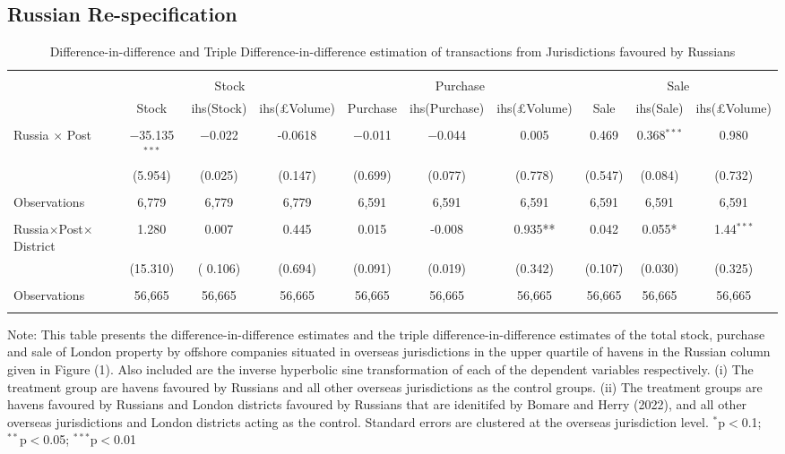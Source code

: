 \documentclass{article}
\begin{document}
\subsection{Russian Re-specification}
\begin{table}[H]
\caption{Difference-in-difference and Triple Difference-in-difference estimation of transactions from Jurisdictions favoured by Russians}
\label{yourLabelHere}
\centering
\large 
\begin{adjustbox}{width=1.25\textwidth,center}
\begin{threeparttable}
\begin{tabular}{@{}lccccccccc@{}}
\hline
\hline \\ [-1.8ex]
 & \multicolumn{3}{c}{Stock} & \multicolumn{3}{c}{Purchase} & \multicolumn{3}{c}{Sale} \\
\cmidrule{2-4} \cmidrule{5-7} \cmidrule{8-10}
& Stock & ihs(Stock) & ihs(£Volume) & Purchase & ihs(Purchase) & ihs(£Volume) & Sale & ihs(Sale) & ihs(£Volume) \\
\hline \\[-1.8ex]
Russia $\times$ Post & $-$35.135$^{***}$ & $-$0.022 & -0.0618 & $-$0.011 & $-$0.044 & 0.005 & 0.469 & 0.368$^{***}$ & 0.980 \\
& (5.954) & (0.025) &  (0.147) & (0.699) & (0.077)& (0.778) & (0.547) & (0.084) & (0.732) \\
\hline \\ [-1.8ex]
Observations & 6,779 & 6,779 & 6,779 & 6,591 & 6,591 & 6,591 & 6,591 & 6,591 & 6,591 \\
\hline
\hline \\ [-1.8ex]
Russia$\times$Post$\times$District &  1.280 & 0.007 & 0.445 & 0.015 & -0.008 & 0.935** & 0.042& 0.055* & 1.44$^{***}$ \\
& (15.310) & ( 0.106) & (0.694) & (0.091) & (0.019) & (0.342) & (0.107) & (0.030) & (0.325)\\
\hline \\ [-1.8ex]
Observations & 56,665 & 56,665 & 56,665 & 56,665 & 56,665 & 56,665 & 56,665 & 56,665 & 56,665 \\
\hline
\hline \\ [-1.8ex]
\end{tabular}
\begin{tablenotes}
\item
    Note: This table presents the difference-in-difference estimates and the triple difference-in-difference estimates of the total stock, purchase and sale of London property by offshore companies situated in overseas jurisdictions in the upper quartile of havens in the Russian column given in Figure (1). Also included are the inverse hyperbolic sine transformation of each of the dependent variables respectively. (i) The treatment group are havens favoured by Russians and all other overseas jurisdictions as the control groups. (ii) The treatment groups are havens favoured by Russians and London districts favoured by Russians that are idenitifed by Bomare and Herry (2022), and all other overseas jurisdictions and London districts acting as the control. Standard errors are clustered at the overseas jurisdiction level. $^{*}$p$<$0.1; $^{**}$p$<$0.05; $^{***}$p$<$0.01

\end{tablenotes}
\end{threeparttable}
\end{adjustbox}
\end{table}
\end{document}
